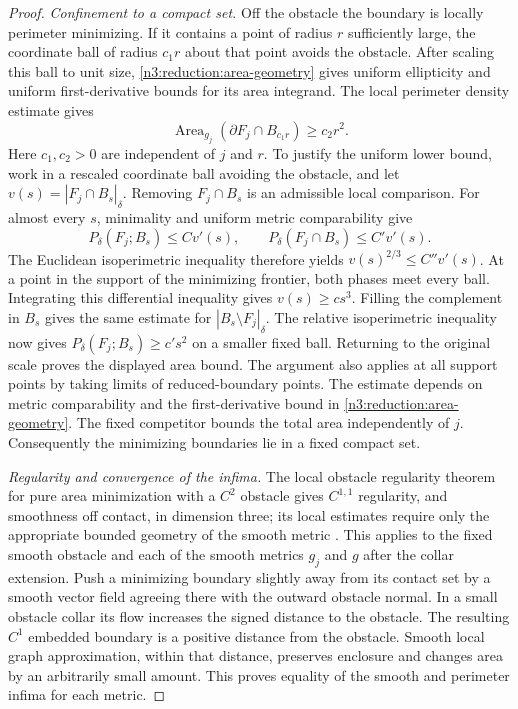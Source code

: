 \begin{proof}
\emph{Confinement to a compact set.} Off the obstacle the boundary is
locally perimeter minimizing.  If it
contains a point of radius $r$ sufficiently large, the coordinate ball
of radius $c_1r$ about that point avoids the obstacle.  After scaling
this ball to unit size, \eqref{n3:reduction:area-geometry} gives
uniform ellipticity and uniform first-derivative bounds for its area
integrand.  The local perimeter density estimate gives
\[
 \operatorname{Area}_{g_j}
       (\partial F_j\cap B_{c_1r})\ge c_2r^2.
\]
Here $c_1,c_2>0$ are independent of $j$ and $r$. To justify the
uniform lower bound, work in a rescaled coordinate ball avoiding the
obstacle, and let $v(s)=|F_j\cap B_s|_\delta$. Removing $F_j\cap B_s$
is an admissible local comparison. For almost every $s$, minimality
and uniform metric comparability give
\[
 P_\delta(F_j;B_s)\le C v'(s),\qquad
 P_\delta(F_j\cap B_s)\le C'v'(s).
\]
The Euclidean isoperimetric inequality therefore yields
$v(s)^{2/3}\le C''v'(s)$. At a point in the support of the minimizing
frontier, both phases meet every ball. Integrating this differential
inequality gives $v(s)\ge c s^3$. Filling the complement in $B_s$
gives the same estimate for $|B_s\setminus F_j|_\delta$. The relative
isoperimetric inequality now gives
$P_\delta(F_j;B_s)\ge c's^2$ on a smaller fixed ball. Returning to
the original scale proves the displayed area bound. The argument also
applies at all support points by taking limits of reduced-boundary
points. The estimate depends on metric comparability and the
first-derivative bound in \eqref{n3:reduction:area-geometry}.
The fixed competitor bounds the total area independently of $j$.
Consequently the minimizing boundaries lie in a fixed compact set.

\emph{Regularity and convergence of the infima.} The local obstacle
regularity theorem for pure area minimization with
a $C^2$ obstacle gives $C^{1,1}$ regularity, and smoothness off contact,
in dimension three; its local estimates require only the appropriate
bounded geometry of the smooth metric
\cite[Regularity Theorem 1.3]{HuiskenIlmanen2001}.
This applies to the fixed smooth obstacle and each of the smooth
metrics $g_j$ and $g$ after the collar extension. Push a minimizing
boundary slightly away from its contact set by a smooth vector field agreeing
there with the outward obstacle normal.  In a small obstacle collar its
flow increases the signed distance to the obstacle.  The resulting
$C^1$ embedded boundary is a positive distance from the obstacle.
Smooth local graph approximation, within that distance, preserves
enclosure and changes area by an arbitrarily small amount.  This proves
equality of the smooth and perimeter infima for each metric.


\end{proof}
